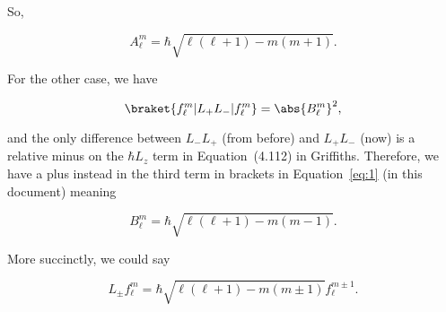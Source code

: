 So,

\begin{equation}
    \boxed{A_{\ell}^m = \hbar \sqrt{\ell(\ell+1) - m(m+1)}.}
\end{equation}

For the other case, we have

\begin{equation}
    \braket{f_{\ell}^m | L_+L_- | f_{\ell}^m} = \abs{B_{\ell}^m}^2,
\end{equation}

and the only difference between $L_-L_+$ (from before) and $L_+L_-$ (now) is a relative minus on the $\hbar L_z$ term in Equation~(4.112) in Griffiths. Therefore, we have a plus instead in the third term in brackets in Equation~\eqref{eq:1} (in this document) meaning

\begin{equation}
    \boxed{B_{\ell}^m = \hbar\sqrt{\ell(\ell+1) - m(m-1)}.}
\end{equation}

More succinctly, we could say

\begin{equation}
    L_{\pm}f_{\ell}^m = \hbar \sqrt{\ell(\ell+1) - m(m \pm 1)} f_{\ell}^{m \pm 1}.
\end{equation}
